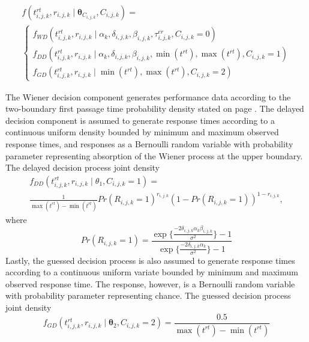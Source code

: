 \documentclass[12pt]{article}
\begin{document}
\begin{gather}
f(t_{i,j,k}^{rt},r_{i,j,k} \mid \boldsymbol{\theta}_{C_{i,j,k}}, C_{i,j,k}) = \nonumber \\
\begin{cases}
f_{WD}(t_{i,j,k}^{rt},r_{i,j,k} \mid \alpha_k,\delta_{i,j,k},\beta_{i,j,k},\tau_{i,j,k}^{er}, C_{i,j,k} = 0) \\
f_{DD}(t_{i,j,k}^{rt},r_{i,j,k} \mid \alpha_k,\delta_{i,j,k},\beta_{i,j,k},\operatorname{min}(t^{rt}),\operatorname{max}(t^{rt}), C_{i,j,k} = 1) \\
f_{GD}(t_{i,j,k}^{rt},r_{i,j,k} \mid \operatorname{min}(t^{rt}),\operatorname{max}(t^{rt}), C_{i,j,k} = 2)
\end{cases}
\end{gather}

	The Wiener decision component generates performance data according to the two-boundary first passage time probability density stated on page \pageref{eqn:wd}. The delayed decision component is assumed to generate response times according to a continuous uniform density bounded by minimum and maximum observed response times, and responses as a Bernoulli random variable with probability parameter representing absorption of the Wiener process at the upper boundary. The delayed decision process joint density
\begin{gather}
f_{DD}(t_{i,j,k}^{rt},r_{i,j,k} \mid \theta_1, C_{i,j,k} = 1) = \nonumber \\ 
\frac{1}{\operatorname{max}(t^{rt}) - \operatorname{min}(t^{rt})}Pr(R_{i,j,k}=1)^{r_{i,j,k}}(1-Pr(R_{i,j,k}=1))^{1-r_{i,j,k}},
\end{gather}
where
\begin{equation*}
Pr(R_{i,j,k}=1) = \frac{\operatorname{exp}                   \{\frac{-2\delta_{i,j,k} \alpha_k \beta_{i,j,k}}{\sigma^2}
\} - 1}{\operatorname{exp}\{
\frac{-2\delta_{i,j,k} \alpha_k}{\sigma^2}
\} - 1}
\end{equation*}
Lastly, the guessed decision process is also assumed to generate response times according to a continuous uniform variate bounded by minimum and maximum observed response time. The response, however, is a Bernoulli random variable with probability parameter representing chance. The guessed decision process joint density
\begin{equation}
f_{GD}(t_{i,j,k}^{rt},r_{i,j,k} \mid \boldsymbol{\theta}_2, C_{i,j,k} = 2) = \frac{0.5}{\operatorname{max}(t^{rt})-\operatorname{min}(t^{rt})}
\end{equation}
\end{document}
